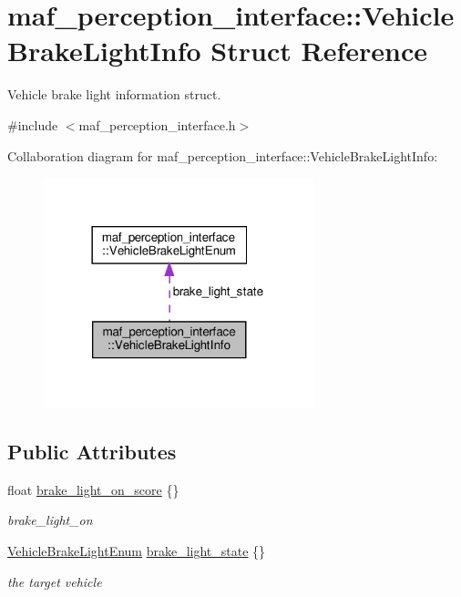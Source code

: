 \hypertarget{structmaf__perception__interface_1_1VehicleBrakeLightInfo}{}\section{maf\+\_\+perception\+\_\+interface\+:\+:Vehicle\+Brake\+Light\+Info Struct Reference}
\label{structmaf__perception__interface_1_1VehicleBrakeLightInfo}


Vehicle brake light information struct.  




{\ttfamily \#include $<$maf\+\_\+perception\+\_\+interface.\+h$>$}



Collaboration diagram for maf\+\_\+perception\+\_\+interface\+:\+:Vehicle\+Brake\+Light\+Info\+:\nopagebreak
\begin{figure}[H]
\begin{center}
\leavevmode
\includegraphics[width=222pt]{structmaf__perception__interface_1_1VehicleBrakeLightInfo__coll__graph}
\end{center}
\end{figure}
\subsection*{Public Attributes}
\begin{DoxyCompactItemize}
\item 
float \hyperlink{structmaf__perception__interface_1_1VehicleBrakeLightInfo_adac05f2bc944d3aba458b86e5e660423}{brake\+\_\+light\+\_\+on\+\_\+score} \{\}
\begin{DoxyCompactList}\small\item\em brake\+\_\+light\+\_\+on \end{DoxyCompactList}\item 
\hyperlink{structmaf__perception__interface_1_1VehicleBrakeLightEnum}{Vehicle\+Brake\+Light\+Enum} \hyperlink{structmaf__perception__interface_1_1VehicleBrakeLightInfo_a18f447e666ce5483f0df8d603d841035}{brake\+\_\+light\+\_\+state} \{\}
\begin{DoxyCompactList}\small\item\em the target vehicle \end{DoxyCompactList}\end{DoxyCompactItemize}


